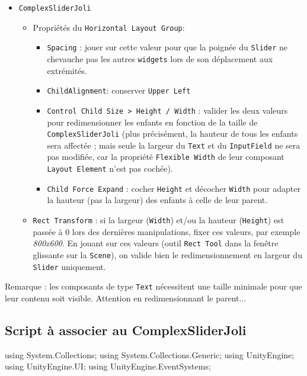 \documentclass[a4paper,10pt]{article}
\newenvironment{solution}%
{\begin{tcolorbox}[breakable,colback=red!5!white,colframe=red!75!black,title=Solution]}%
{\end{tcolorbox}}
\newenvironment{boxcode}%
{\begin{tcolorbox}[breakable,colback=gray!5!white,colframe=black]}%
	{\end{tcolorbox}}
\begin{document}
\begin{solution}
\begin{itemize} 	
	\item  \texttt{ComplexSliderJoli}
	\begin{itemize} 	
		\item Propriétés du \texttt{Horizontal Layout Group}:
		\begin{itemize} 
			\item \texttt{Spacing} : jouer sur cette valeur pour que la poignée du \texttt{Slider} ne chevauche pas les autres \texttt{widgets} lors de son déplacement aux extrémités.	
			\item \texttt{ChildAlignment}: conserver \texttt{Upper Left}
			\item \texttt{Control Child Size > Height / Width} : valider les deux valeurs pour redimensionner les enfants en fonction de la taille de \texttt{ComplexSliderJoli} (plus précisément, la hauteur de tous les enfants sera affectée ; mais seule la largeur du \texttt{Text} et du \texttt{InputField} ne sera pas modifiée, car la propriété \texttt{Flexible Width} de leur composant \texttt{Layout Element} n'est pas cochée).
			\item \texttt{Child Force Expand} : cocher \texttt{Height} et décocher \texttt{Width} pour adapter la hauteur (pas la largeur) des enfants à celle de leur parent.		
		\end{itemize}	
		\item \texttt{Rect Transform} : si la largeur (\texttt{Width}) et/ou la hauteur (\texttt{Height}) est passée à $0$ lors des dernières manipulations, fixer ces valeurs, par exemple \textit{800x600}. En jouant sur ces valeurs (outil \texttt{Rect Tool} dans la fenêtre glissante sur la \texttt{Scene}), on valide bien le redimensionnement en largeur du \texttt{Slider} uniquement.
	\end{itemize}
\end{itemize}

Remarque : les composants de type \texttt{Text} nécessitent une taille minimale pour que leur contenu soit visible. Attention en redimensionnant le parent...

\subsection{Script à associer au ComplexSliderJoli}

\begin{boxcode}
\begin{csharpsansbord}
using System.Collections;
using System.Collections.Generic;
using UnityEngine;
using UnityEngine.UI;
using UnityEngine.EventSystems;


\end{csharpsansbord}
\end{boxcode}
\end{solution}
\end{document}
